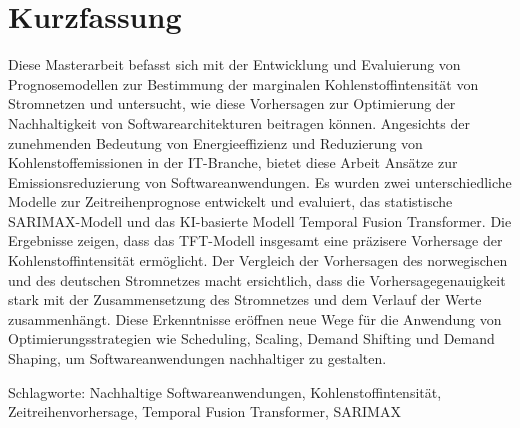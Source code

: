 \chapter*{Kurzfassung}
\thispagestyle{empty}
Diese Masterarbeit befasst sich mit der Entwicklung und Evaluierung von Prognosemodellen zur Bestimmung der marginalen Kohlenstoffintensität von Stromnetzen und untersucht, wie diese Vorhersagen zur Optimierung der Nachhaltigkeit von Softwarearchitekturen beitragen können.
Angesichts der zunehmenden Bedeutung von Energieeffizienz und Reduzierung von Kohlenstoffemissionen in der IT-Branche, bietet diese Arbeit Ansätze zur Emissionsreduzierung von Softwareanwendungen.
Es wurden zwei unterschiedliche Modelle zur Zeitreihenprognose entwickelt und evaluiert, das statistische SARIMAX-Modell und das KI-basierte Modell Temporal Fusion Transformer.
Die Ergebnisse zeigen, dass das TFT-Modell insgesamt eine präzisere Vorhersage der Kohlenstoffintensität ermöglicht.
Der Vergleich der Vorhersagen des norwegischen und des deutschen Stromnetzes macht ersichtlich, dass die Vorhersagegenauigkeit stark mit der Zusammensetzung des Stromnetzes und dem Verlauf der Werte zusammenhängt.
Diese Erkenntnisse eröffnen neue Wege für die Anwendung von Optimierungsstrategien wie Scheduling, Scaling, Demand Shifting und Demand Shaping, um Softwareanwendungen nachhaltiger zu gestalten.

\bigskip

\noindent
Schlagworte: Nachhaltige Softwareanwendungen, Kohlenstoffintensität, Zeitreihenvorhersage, Temporal Fusion Transformer, SARIMAX

